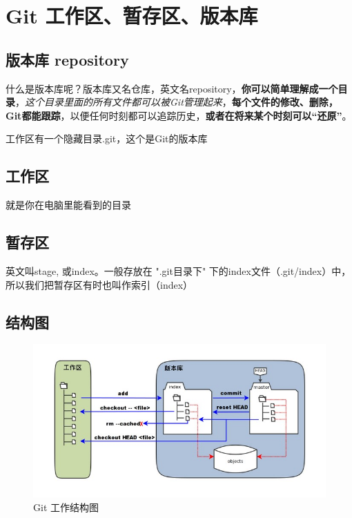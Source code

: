 \documentclass[UTF8,a4paper,12pt]{ctexbook}
\begin{document}
  \chapter{Git 工作区、暂存区、版本库}
	  \section{版本库 repository}
		  什么是版本库呢？版本库又名仓库，英文名repository，\textbf{你可以简单理解成一个目录}，\textit{这个目录里面的所有文件都可以被Git管理起来}，\textbf{每个文件的修改、删除，Git都能跟踪}，以便任何时刻都可以追踪历史，\textbf{或者在将来某个时刻可以“还原”}。
		  
		  工作区有一个隐藏目录.git，这个是Git的版本库
	  \section{工作区}
		  就是你在电脑里能看到的目录
		  
	  \section{暂存区}
		  英文叫stage, 或index。一般存放在 ".git目录下" 下的index文件（.git/index）中，所以我们把暂存区有时也叫作索引（index）
		  
	  \section{结构图}
	  
		  \begin{figure}[h]
		  	\centering
		  	\includegraphics[scale = 0.8]{git-arc.jpg}
		  	\caption{Git 工作结构图}
		  \end{figure}
		  
\end{document}
